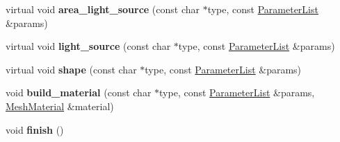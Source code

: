 \begin{DoxyCompactItemize}
\mbox{\label{structpbrt_1_1_fermat_importer_a3d2b8ce677d0a017a6f1e0db8ec5519f}} 
virtual void {\bfseries area\+\_\+light\+\_\+source} (const char $\ast$type, const \hyperlink{structpbrt_1_1_parameter_list}{Parameter\+List} \&params)
\item 
\mbox{\label{structpbrt_1_1_fermat_importer_af838c7165a99353f1dd24f954e199f04}} 
virtual void {\bfseries light\+\_\+source} (const char $\ast$type, const \hyperlink{structpbrt_1_1_parameter_list}{Parameter\+List} \&params)
\item 
\mbox{\label{structpbrt_1_1_fermat_importer_ae71d871bfd10584e26f0a99d91ab5443}} 
virtual void {\bfseries shape} (const char $\ast$type, const \hyperlink{structpbrt_1_1_parameter_list}{Parameter\+List} \&params)
\item 
\mbox{\label{structpbrt_1_1_fermat_importer_a5f3a7b08d9f67a525ccd9d84e989194c}} 
void {\bfseries build\+\_\+material} (const char $\ast$type, const \hyperlink{structpbrt_1_1_parameter_list}{Parameter\+List} \&params, \hyperlink{struct_mesh_material}{Mesh\+Material} \&material)
\item 
\mbox{\label{structpbrt_1_1_fermat_importer_a93e2f9172213d074ed630a9e194cff40}} 
void {\bfseries finish} ()
\end{DoxyCompactItemize}
